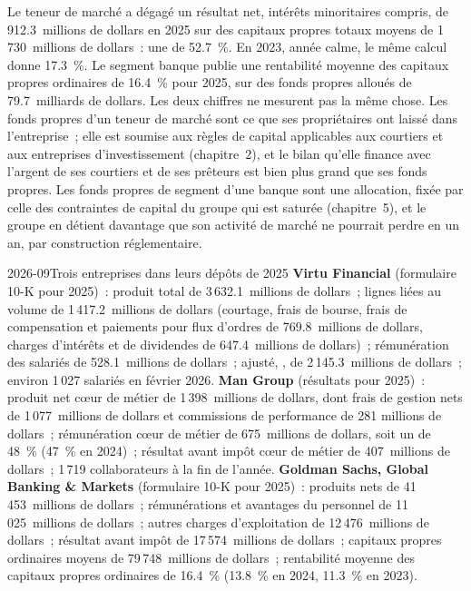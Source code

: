 Le teneur de marché a dégagé un résultat net, intérêts minoritaires compris, de 912.3~millions de dollars en 2025 sur des capitaux propres totaux moyens de 1\,730~millions de dollars~:
une  de 52.7~\%. En 2023, année calme, le même calcul donne 17.3~\%. Le segment banque publie une rentabilité moyenne des capitaux propres ordinaires de 16.4~\%
pour 2025, sur des fonds propres alloués de 79.7~milliards de dollars. Les deux chiffres ne mesurent pas la même chose. Les fonds propres d'un teneur de marché sont ce que ses propriétaires ont
laissé dans l'entreprise~; elle est soumise aux règles de capital applicables aux courtiers et aux entreprises d'investissement (chapitre~2), et le bilan qu'elle finance avec l'argent de ses
courtiers et de ses prêteurs est bien plus grand que ses fonds propres. Les fonds propres de segment d'une banque sont une allocation, fixée par celle des contraintes de capital du groupe
qui est saturée (chapitre~5), et le groupe en détient davantage que son activité de marché ne pourrait perdre en un an, par construction réglementaire.

\begin{dated}{2026-09}{Trois entreprises dans leurs dépôts de 2025}\label{dat:fm:the-economics-of-a-trading-firm:three}
\textbf{Virtu Financial} (formulaire 10-K pour 2025)~: produit total de 3\,632.1~millions de dollars~; lignes liées au volume de 1\,417.2~millions de dollars (courtage, frais de bourse,
frais de compensation et paiements pour flux d'ordres de 769.8~millions de dollars, charges d'intérêts et de dividendes de 647.4~millions de dollars)~; rémunération des salariés de 528.1~millions de dollars~;
 ajusté, , de 2\,145.3~millions de dollars~; environ 1\,027 salariés en février 2026.
\textbf{Man Group} (résultats pour 2025)~: produit net cœur de métier de 1\,398~millions de dollars, dont frais de gestion nets de 1\,077~millions de dollars et commissions de performance de 281
millions de dollars~; rémunération cœur de métier de 675~millions de dollars, soit un  de 48~\% (47~\% en 2024)~; résultat avant impôt cœur de métier de 407~millions de dollars~; 1\,719 collaborateurs à la fin
de l'année. \textbf{Goldman Sachs, Global Banking \& Markets} (formulaire 10-K pour 2025)~: produits nets de 41\,453~millions de dollars~; rémunérations et avantages du personnel
de 11\,025~millions de dollars~; autres charges d'exploitation de 12\,476~millions de dollars~; résultat avant impôt de 17\,574~millions de dollars~; capitaux propres ordinaires moyens de 79\,748~millions de dollars~; rentabilité
moyenne des capitaux propres ordinaires de 16.4~\% (13.8~\% en 2024, 11.3~\% en 2023).
\end{dated}


